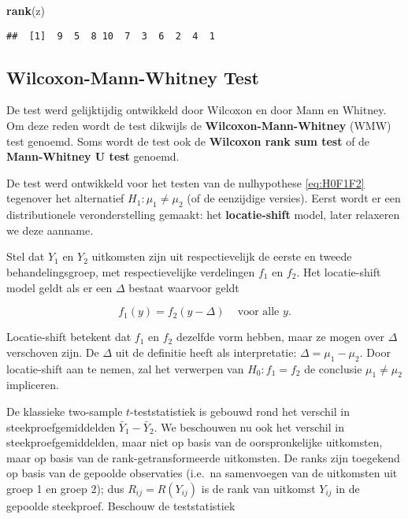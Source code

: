 \documentclass[
  12pt,dutch,coursenotes]{book}
\newenvironment{Shaded}{\begin{snugshade}}{\end{snugshade}}
\newcommand{\KeywordTok}[1]{\textcolor[rgb]{0.13,0.29,0.53}{\textbf{#1}}}
\newcommand{\NormalTok}[1]{#1}
\theoremstyle{definition}
\theoremstyle{definition}
\theoremstyle{definition}
\theoremstyle{remark}
\begin{document}
\begin{Shaded}
\begin{Highlighting}[]
\KeywordTok{rank}\NormalTok{(z)}
\end{Highlighting}
\end{Shaded}

\begin{verbatim}
##  [1]  9  5  8 10  7  3  6  2  4  1
\end{verbatim}

\hypertarget{wilcoxon-mann-whitney-test}{%
\subsection{Wilcoxon-Mann-Whitney Test}\label{wilcoxon-mann-whitney-test}}

De test werd gelijktijdig ontwikkeld door Wilcoxon en door Mann en Whitney. Om deze reden wordt de test dikwijls de \textbf{Wilcoxon-Mann-Whitney} (WMW) test genoemd. Soms wordt de test ook de \textbf{Wilcoxon rank sum test} of de \textbf{Mann-Whitney U test} genoemd.

De test werd ontwikkeld voor het testen van de nulhypothese \eqref{eq:H0F1F2} tegenover het alternatief \(H_1: \mu_1\neq \mu_2\) (of de eenzijdige versies). Eerst wordt er een distributionele veronderstelling gemaakt: het \textbf{locatie-shift} model, later relaxeren we deze aanname.

Stel dat \(Y_1\) en \(Y_2\) uitkomsten zijn uit respectievelijk de eerste en tweede behandelingsgroep, met respectievelijke verdelingen \(f_1\) en \(f_2\). Het locatie-shift model geldt als er een \(\Delta\) bestaat waarvoor geldt

\[
   f_1(y)=f_2(y-\Delta) \;\;\;\text{ voor alle } y.
 \]

Locatie-shift betekent dat \(f_1\) en \(f_2\) dezelfde vorm hebben, maar ze mogen over \(\Delta\) verschoven zijn.
De \(\Delta\) uit de definitie heeft als interpretatie: \(\Delta = \mu_1-\mu_2\).
Door locatie-shift aan te nemen, zal het verwerpen van \(H_0: f_1=f_2\) de conclusie \(\mu_1\neq \mu_2\) impliceren.

De klassieke two-sample \(t\)-teststatistiek is gebouwd rond het verschil in steekproefgemiddelden \(\bar{Y}_1-\bar{Y}_2\). We beschouwen nu ook het verschil in steekproefgemiddelden, maar niet op basis van de oorspronkelijke uitkomsten, maar op basis van de rank-getransformeerde uitkomsten. De ranks zijn toegekend op basis van de gepoolde observaties (i.e.~na samenvoegen van de uitkomsten uit groep 1 en groep 2); dus \(R_{ij}=R(Y_{ij})\) is de rank van uitkomst \(Y_{ij}\) in de gepoolde steekproef.
Beschouw de teststatistiek
\end{document}
